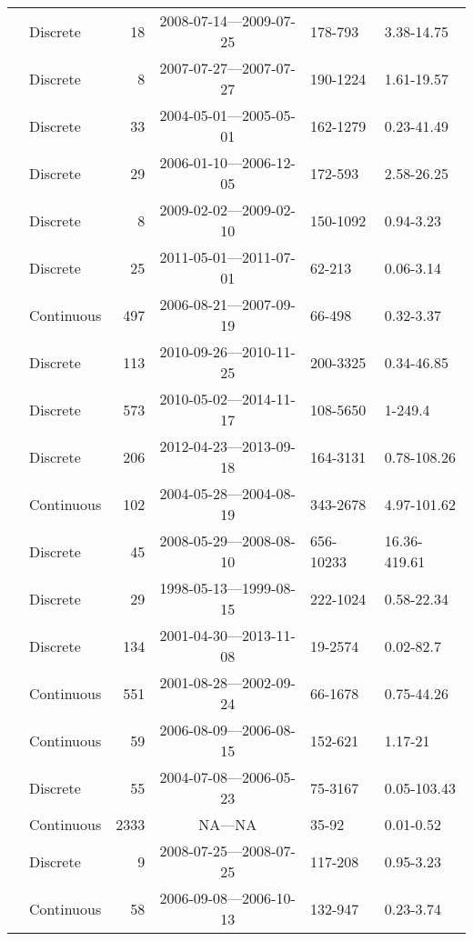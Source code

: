 \begin{longtable}{llrcll}
  \citet{Griffin2011} & Discrete &  18 & 2008-07-14---2009-07-25 & 178-793 & 3.38-14.75 \\ 
  \citet{Gueguen2011} & Discrete &   8 & 2007-07-27---2007-07-27 & 190-1224 & 1.61-19.57 \\ 
  \citet{Helms2008} & Discrete &  33 & 2004-05-01---2005-05-01 & 162-1279 & 0.23-41.49 \\ 
  \citet{Hernes2008} & Discrete &  29 & 2006-01-10---2006-12-05 & 172-593 & 2.58-26.25 \\ 
  \citet{Hong2012} & Discrete &   8 & 2009-02-02---2009-02-10 & 150-1092 & 0.94-3.23 \\ 
  \citet{Hur2014} & Discrete &  25 & 2011-05-01---2011-07-01 & 62-213 & 0.06-3.14 \\ 
  \citet{kattegat} & Continuous & 497 & 2006-08-21---2007-09-19 & 66-498 & 0.32-3.37 \\ 
  \citet{Kellerman2015} & Discrete & 113 & 2010-09-26---2010-11-25 & 200-3325 & 0.34-46.85 \\ 
  \citet{Lambert2015a} & Discrete & 573 & 2010-05-02---2014-11-17 & 108-5650 & 1-249.4 \\ 
  \citet{Loken2016} & Discrete & 206 & 2012-04-23---2013-09-18 & 164-3131 & 0.78-108.26 \\ 
  \citet{lter2004} & Continuous & 102 & 2004-05-28---2004-08-19 & 343-2678 & 4.97-101.62 \\ 
  \citet{lter2008} & Discrete &  45 & 2008-05-29---2008-08-10 & 656-10233 & 16.36-419.61 \\ 
  \citet{lter5653} & Discrete &  29 & 1998-05-13---1999-08-15 & 222-1024 & 0.58-22.34 \\ 
  \citet{lter5689} & Discrete & 134 & 2001-04-30---2013-11-08 & 19-2574 & 0.02-82.7 \\ 
  \citet{Markager2011} & Continuous & 551 & 2001-08-28---2002-09-24 & 66-1678 & 0.75-44.26 \\ 
  \citet{Massicotte2011EA} & Continuous &  59 & 2006-08-09---2006-08-15 & 152-621 & 1.17-21 \\ 
  \citet{Moran2006} & Discrete &  55 & 2004-07-08---2006-05-23 & 75-3167 & 0.05-103.43 \\ 
  \citet{Nelson2002, Nelson2007, Nelson2010} & Continuous & 2333 & NA---NA & 35-92 & 0.01-0.52 \\ 
  \citet{Nguyen2010} & Discrete &   9 & 2008-07-25---2008-07-25 & 117-208 & 0.95-3.23 \\ 
  \citet{Norman2011} & Continuous &  58 & 2006-09-08---2006-10-13 & 132-947 & 0.23-3.74 \\ 

\end{longtable}

